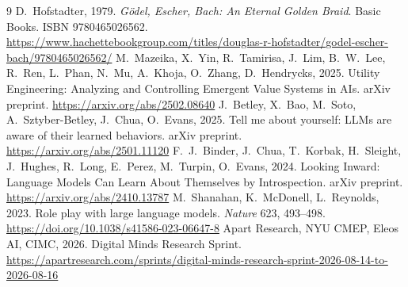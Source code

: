 \documentclass[11pt]{article}
\begin{document}

\begin{thebibliography}{9}\small
{} D.~Hofstadter, 1979. \emph{G\"odel, Escher, Bach: An Eternal
Golden Braid}. Basic Books. ISBN 9780465026562.
\url{https://www.hachettebookgroup.com/titles/douglas-r-hofstadter/godel-escher-bach/9780465026562/}
 M.~Mazeika, X.~Yin, R.~Tamirisa, J.~Lim, B.~W.~Lee, R.~Ren,
L.~Phan, N.~Mu, A.~Khoja, O.~Zhang, D.~Hendrycks, 2025. Utility Engineering:
Analyzing and Controlling Emergent Value Systems in AIs. arXiv preprint.
\url{https://arxiv.org/abs/2502.08640}
 J.~Betley, X.~Bao, M.~Soto, A.~Sztyber-Betley, J.~Chua,
O.~Evans, 2025. Tell me about yourself: LLMs are aware of their learned
behaviors. arXiv preprint. \url{https://arxiv.org/abs/2501.11120}
 F.~J.~Binder, J.~Chua, T.~Korbak, H.~Sleight, J.~Hughes,
R.~Long, E.~Perez, M.~Turpin, O.~Evans, 2024. Looking Inward: Language Models
Can Learn About Themselves by Introspection. arXiv preprint.
\url{https://arxiv.org/abs/2410.13787}
 M.~Shanahan, K.~McDonell, L.~Reynolds, 2023. Role play with
large language models. \emph{Nature} 623, 493--498.
\url{https://doi.org/10.1038/s41586-023-06647-8}
 Apart Research, NYU CMEP, Eleos AI, CIMC, 2026. Digital Minds
Research Sprint.
\url{https://apartresearch.com/sprints/digital-minds-research-sprint-2026-08-14-to-2026-08-16}
\end{thebibliography}

\appendix
\end{document}
